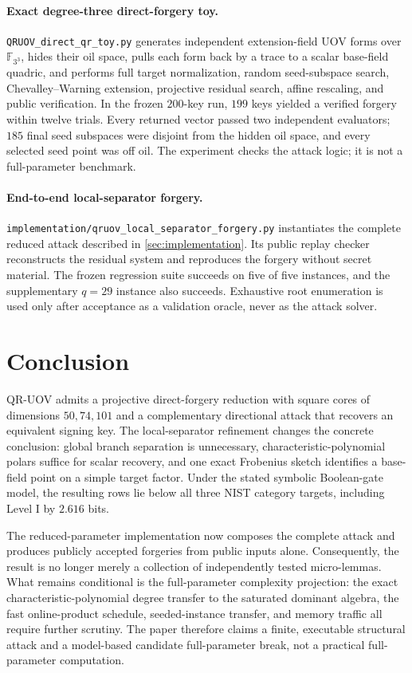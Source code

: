 \documentclass[11pt,a4paper]{article}
\theoremstyle{definition}
\theoremstyle{remark}
\newcommand{\F}{\mathbb F}
\begin{document}
\paragraph{Exact degree-three direct-forgery toy.}
\texttt{QRUOV\_direct\_qr\_toy.py} generates independent extension-field UOV
forms over $\F_{3^3}$, hides their oil space, pulls each form back by a trace to
a scalar base-field quadric, and performs full target normalization, random
seed-subspace search, Chevalley--Warning extension, projective residual search,
affine rescaling, and public verification.  In the frozen $200$-key run, $199$ keys yielded a verified forgery within twelve trials.  Every returned vector passed two independent evaluators; $185$ final seed subspaces were disjoint from the hidden oil space, and every selected seed point was off oil.  The experiment checks the attack logic; it is not a full-parameter benchmark.


\paragraph{End-to-end local-separator forgery.}
\texttt{implementation/qruov\_local\_separator\_forgery.py} instantiates the
complete reduced attack described in \cref{sec:implementation}.  Its public
replay checker reconstructs the residual system and reproduces the forgery
without secret material.  The frozen regression suite succeeds on five of five
instances, and the supplementary $q=29$ instance also succeeds.  Exhaustive
root enumeration is used only after acceptance as a validation oracle, never as
the attack solver.

\section{Conclusion}\label{sec:conclusion}
QR-UOV admits a projective direct-forgery reduction with square cores of
dimensions $50,74,101$ and a complementary directional attack that recovers an
equivalent signing key.  The local-separator refinement changes the concrete
conclusion: global branch separation is unnecessary, characteristic-polynomial
polars suffice for scalar recovery, and one exact Frobenius sketch identifies a
base-field point on a simple target factor.  Under the stated symbolic
Boolean-gate model, the resulting rows lie below all three NIST category
targets, including Level I by $2.616$ bits.

The reduced-parameter implementation now composes the complete attack and
produces publicly accepted forgeries from public inputs alone.  Consequently,
the result is no longer merely a collection of independently tested
micro-lemmas.  What remains conditional is the full-parameter complexity
projection: the exact characteristic-polynomial degree transfer to the
saturated dominant algebra, the fast online-product schedule, seeded-instance
transfer, and memory traffic all require further scrutiny.  The paper therefore
claims a finite, executable structural attack and a model-based candidate
full-parameter break, not a practical full-parameter computation.
\end{document}
